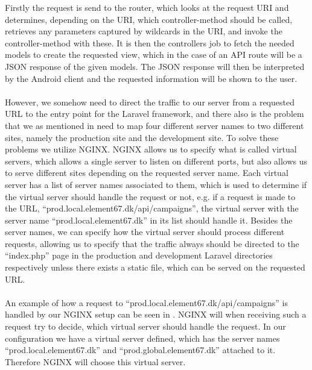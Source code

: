 Firstly the request is send to the router, which looks at the request URI and determines, depending on the URI, which controller-method should be called, retrieves any parameters captured by wildcards in the URI, and invoke the controller-method with these. It is then the controllers job to fetch the needed models to create the requested view, which in the case of an API route will be a JSON response of the given models. The JSON response will then be interpreted by the Android client and the requested information will be shown to the user. 
\\\\
However, we somehow need to direct the traffic to our server from a requested URL to the entry point for the Laravel framework, and there also is the problem that we as mentioned in  need to map four different server names to two different sites, namely the production site and the development site. To solve these problems we utilize NGINX. NGINX allows us to specify what is called virtual servers, which allows a single server to listen on different ports, but also allows us to serve different sites depending on the requested server name. Each virtual server has a list of server names associated to them, which is used to determine if the virtual server should handle the request or not, e.g. if a request is made to the URL, ``prod.local.element67.dk/api/campaigns'', the virtual server with the server name ``prod.local.element67.dk'' in its list should handle it. 
Besides the server names, we can specify how the virtual server should process different requests, allowing us to specify that the traffic always should be directed to the ``index.php'' page in the production and development Laravel directories respectively unless there exists a static file, which can be served on the requested URL. 
\\\\
An example of how a request to ``prod.local.element67.dk/api/campaigns'' is handled by our NGINX setup can be seen in . NGINX will when receiving such a request try to decide, which virtual server should handle the request. In our configuration we have a virtual server defined, which has the server names ``prod.local.element67.dk'' and ``prod.global.element67.dk'' attached to it. Therefore NGINX will choose this virtual server. 
\\\\ %

